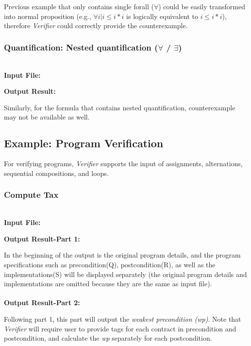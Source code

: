 \hspace{1mm}Previous example that only contains single forall ($\forall$) could be easily transformed into normal proposition (e.g., $\forall i | i \leq i * i$ is logically equivalent to $i \leq i * i$), therefore \emph{Verifier} could correctly provide the counterexample. \\



\subsubsection{Quantification: Nested quantification ($\forall$ / $\exists$)}
~\\
{\bf Input File:}

{\bf Output Result:}

\hspace{4mm}Similarly, for the formula that contains nested quantification, counterexample may not be available as well.


\subsection{Example: Program Verification}
\hspace{4mm}For verifying programs, \emph{Verifier} supports the input of assignments, alternations, sequential compositions, and loops.\\
\subsubsection{Compute Tax}
~\\
{\bf Input File:}

{\bf Output Result-Part 1:}

\hspace{4mm}{\bf Part 1:} In the beginning of the output is the original program details, and the program specifications such as precondition(Q), postcondition(R), as well as the implementations(S) will be displayed separately (the original program details and implementations are omitted because they are the same as input file).\\\\
{\bf Output Result-Part 2:}

\hspace{4mm}{\bf Part 2:} Following part 1, this part will output the \emph{weakest precondition (wp)}. Note that \emph{Verifier} will require user to provide tags for each contract in precondition and postcondition, and calculate the \emph{wp} separately for each postcondition. 

